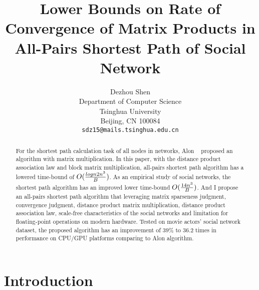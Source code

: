 \documentclass[review]{cvpr}
\begin{document}
\title{Lower Bounds on Rate of Convergence of Matrix Products in All-Pairs Shortest Path of Social Network}

\author{Dezhou Shen\\
Department of Computer Science\\
Tsinghua University\\
Beijing, CN 100084\\
{\tt\small sdz15@mails.tsinghua.edu.cn}
}

\maketitle


\begin{abstract}
  For the shortest path calculation task of all nodes in networks, Alon \etal~\cite{alon1997exponent} proposed an algorithm with matrix multiplication.
  In this paper, with the distance product association law and block matrix multiplication, all-pairs shortest path algorithm has a lowered time-bound of \(O({logn2n^3\over B})\).
  As an empirical study of social networks, the shortest path algorithm has an improved lower time-bound \(O({14n^3 \over B})\).
  And I propose an all-pairs shortest path algorithm that leveraging matrix sparseness judgment, convergence judgment, distance product matrix multiplication, distance product association law,
  scale-free characteristics of the social networks and limitation for floating-point operations on modern hardware.
  Tested on movie actors' social network dataset, the proposed algorithm has an improvement of 39\% to 36.2 times in performance on CPU/GPU platforms comparing to Alon \etal algorithm.
\end{abstract}

\section{Introduction}
\end{document}
